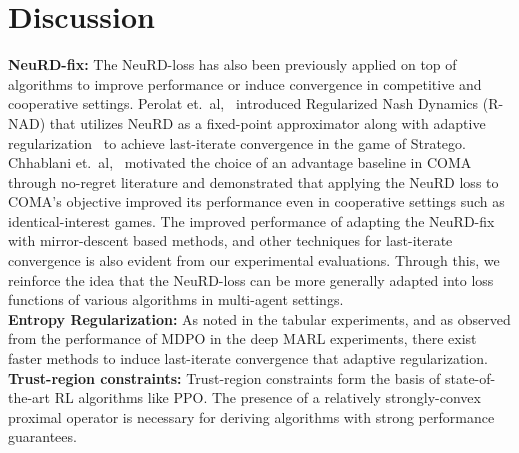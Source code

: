 \chapter{Discussion}

\textbf{NeuRD-fix:}
The NeuRD-loss has also been previously applied on top of algorithms to improve performance or
induce convergence in competitive and cooperative settings.
Perolat et.~al,~\cite{perolatMastering2022} introduced Regularized Nash Dynamics (R-NAD) that
utilizes NeuRD as a fixed-point approximator along with adaptive
regularization~\cite{perolatPoincare2021} to achieve last-iterate convergence in the game of
Stratego.
Chhablani et.~al,~\cite{chhablaniCounterfactual2021} motivated the choice of an advantage baseline
in COMA~\cite{foersterCounterfactual2018} through no-regret literature and demonstrated that
applying the NeuRD loss to COMA's objective improved its performance even in cooperative settings
such as identical-interest games.
The improved performance of adapting the NeuRD-fix with mirror-descent based methods, and other
techniques for last-iterate convergence is also evident from our experimental evaluations.
Through this, we reinforce the idea that the NeuRD-loss can be more generally adapted into loss
functions of various algorithms in multi-agent settings.
\\

\textbf{Entropy Regularization:}
As noted in the tabular experiments, and as observed from the performance of MDPO in the deep MARL
experiments, there exist faster methods to induce last-iterate convergence that adaptive
regularization.
\\

\textbf{Trust-region constraints:}
Trust-region constraints form the basis of state-of-the-art RL algorithms like PPO.
The presence of a relatively strongly-convex proximal operator is necessary for deriving algorithms
with strong performance guarantees.

